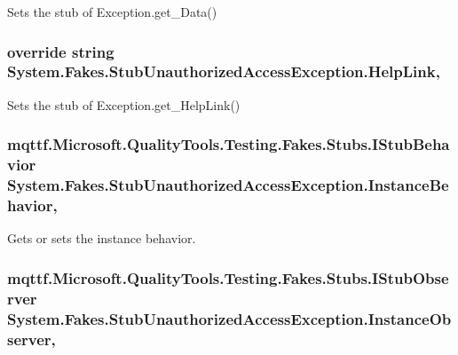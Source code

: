 Sets the stub of Exception.\-get\-\_\-\-Data()

\hypertarget{class_system_1_1_fakes_1_1_stub_unauthorized_access_exception_a395d536d40744d67f0d5a86b81c6d4f6}{
\subsubsection[{Help\-Link}]{\setlength{\rightskip}{0pt plus 5cm}override string System.\-Fakes.\-Stub\-Unauthorized\-Access\-Exception.\-Help\-Link\hspace{0.3cm}{\ttfamily [get]}, {\ttfamily [set]}}}\label{class_system_1_1_fakes_1_1_stub_unauthorized_access_exception_a395d536d40744d67f0d5a86b81c6d4f6}


Sets the stub of Exception.\-get\-\_\-\-Help\-Link()

\hypertarget{class_system_1_1_fakes_1_1_stub_unauthorized_access_exception_a4fc4c490f17903fa5246e493d68f13ef}{
\subsubsection[{Instance\-Behavior}]{\setlength{\rightskip}{0pt plus 5cm}mqttf.\-Microsoft.\-Quality\-Tools.\-Testing.\-Fakes.\-Stubs.\-I\-Stub\-Behavior System.\-Fakes.\-Stub\-Unauthorized\-Access\-Exception.\-Instance\-Behavior\hspace{0.3cm}{\ttfamily [get]}, {\ttfamily [set]}}}\label{class_system_1_1_fakes_1_1_stub_unauthorized_access_exception_a4fc4c490f17903fa5246e493d68f13ef}


Gets or sets the instance behavior.

\hypertarget{class_system_1_1_fakes_1_1_stub_unauthorized_access_exception_a74eab43717b5be54e09777c3245e50b6}{
\subsubsection[{Instance\-Observer}]{\setlength{\rightskip}{0pt plus 5cm}mqttf.\-Microsoft.\-Quality\-Tools.\-Testing.\-Fakes.\-Stubs.\-I\-Stub\-Observer System.\-Fakes.\-Stub\-Unauthorized\-Access\-Exception.\-Instance\-Observer\hspace{0.3cm}{\ttfamily [get]}, {\ttfamily [set]}}}\label{class_system_1_1_fakes_1_1_stub_unauthorized_access_exception_a74eab43717b5be54e09777c3245e50b6}


